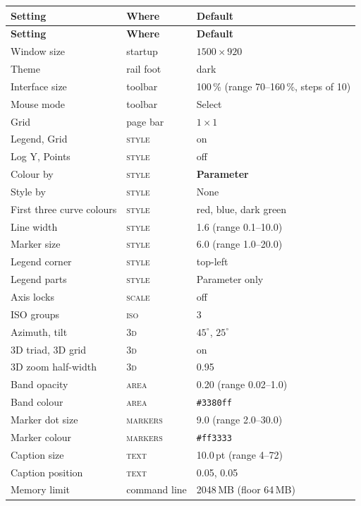 \documentclass[11pt,a4paper,oneside]{report}
\newcommand{\code}[1]{\texttt{#1}}
\newcommand{\tab}[1]{\textsc{#1}}
\begin{document}
\begin{center}
\small
\begin{longtable}{@{}p{}p{}p{}@{}}
\toprule
\textbf{Setting} & \textbf{Where} & \textbf{Default} \\
\midrule
\endfirsthead
\toprule
\textbf{Setting} & \textbf{Where} & \textbf{Default} \\
\midrule
\endhead
Window size & startup & $1500 \times 920$ \\
Theme & rail foot & dark \\
Interface size & toolbar & 100\,\% (range 70--160\,\%, steps of 10) \\
Mouse mode & toolbar & Select \\
Grid & page bar & $1 \times 1$ \\
Legend, Grid & \tab{style} & on \\
Log Y, Points & \tab{style} & off \\
Colour by & \tab{style} & \textbf{Parameter} \\
Style by & \tab{style} & None \\
First three curve colours & \tab{style} & red, blue, dark green \\
Line width & \tab{style} & 1.6 (range 0.1--10.0) \\
Marker size & \tab{style} & 6.0 (range 1.0--20.0) \\
Legend corner & \tab{style} & top-left \\
Legend parts & \tab{style} & Parameter only \\
Axis locks & \tab{scale} & off \\
ISO groups & \tab{iso} & 3 \\
Azimuth, tilt & \tab{3d} & $45^\circ$, $25^\circ$ \\
3D triad, 3D grid & \tab{3d} & on \\
3D zoom half-width & \tab{3d} & 0.95 \\
Band opacity & \tab{area} & 0.20 (range 0.02--1.0) \\
Band colour & \tab{area} & \code{\#3380ff} \\
Marker dot size & \tab{markers} & 9.0 (range 2.0--30.0) \\
Marker colour & \tab{markers} & \code{\#ff3333} \\
Caption size & \tab{text} & 10.0\,pt (range 4--72) \\
Caption position & \tab{text} & 0.05, 0.05 \\
Memory limit & command line & 2048\,MB (floor 64\,MB) \\
\bottomrule
\end{longtable}
\end{center}
\end{document}
